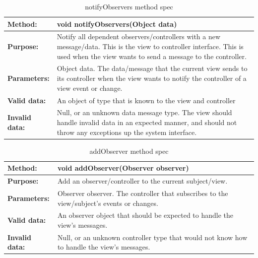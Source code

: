 \documentclass[12pt]{article}
\begin{document}
\begin{table}[H]
  \caption{notifyObservers method spec}
  \begin{center}
    \begin{tabular}{|l|p{10cm}|}
      \hline
      \bf Method: & void notifyObservers(Object data)\\
		\hline
      \bf Purpose: &  Notify all dependent observers/controllers with a new message/data. This is the view to controller interface. This is used when the view wants to send a message to the controller.\\
		\hline
      \bf Parameters: & Object data. The data/message that the current view sends to its controller when the view wants to notify the controller of a view event or change.\\
		\hline
      \bf Valid data: &  An object of type that is known to the view and controller\\
      \hline
      \bf Invalid data: & Null, or an unknown data message type. The view should handle invalid data in an expected manner, and should not throw any exceptions up the system interface.\\
      \hline

    \end{tabular}
  \end{center}
\end{table}

\begin{table}[H]
  \caption{addObserver method spec}
  \begin{center}
    \begin{tabular}{|l|p{10cm}|}
      \hline
      \bf Method: & void addObserver(Observer observer)\\
		\hline
      \bf Purpose: & Add an observer/controller to the current subject/view.\\
		\hline
      \bf Parameters: & Observer observer. The controller that subscribes to the view/subject’s events or changes.\\
		\hline
      \bf Valid data: & An observer object that should be expected to handle the view’s messages.\\
      \hline
      \bf Invalid data: &Null, or an unknown controller type that would not know how to handle the view’s messages.\\
      \hline

    \end{tabular}
  \end{center}
\end{table}
\end{document}
